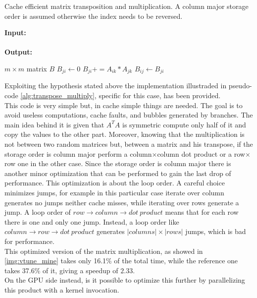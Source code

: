 \begin{algorithm}[h]
  \begin{flushleft}
    \caption{Cache efficient matrix transposition and multiplication. A column major storage order is assumed otherwise the index needs to be reversed.}
    \label{alg:transpose_multiply}
    \textbf{Input:} \\
    \hspace*{\algorithmicindent} \\
    \textbf{Output:} \\
    \hspace*{\algorithmicindent} 
  \end{flushleft}
  \begin{algorithmic}[1]
    \State $m \times m$ matrix $B$
         
        \State $B_{ji} \gets 0$
        \State $B_{ji}+=A_{ik}*A_{jk}$
        \EndFor
        \State $B_{ij} \gets B_{ji}$ 
        \EndFor
        \EndFor
        \EndFunction
      \end{algorithmic}
    \end{algorithm}
Exploiting the hypothesis stated above the implementation illustraded in pseudo-code \ref{alg:transpose_multiply}, specific for this case, has been provided.\\
This code is very simple but, in cache simple things are needed. The goal is to avoid useless computations, cache faults, and bubbles generated by branches. The main idea behind it is given that $A^TA$ is symmetric compute only half of it and copy the values to the other part. Moreover, knowing that the multiplication is not between two random matrices but, between a matrix and his transpose, if the storage order is column major perform a column$\times$column dot product or a row$\times$row one in the other case. Since the storage order is column major there is another minor optimization that can be performed to gain the last drop of performance. This optimization is about the loop order. A careful choice minimizes jumps, for example in this particular case iterate over column generates no jumps neither cache misses, while iterating over rows generate a jump. A loop order of $row \rightarrow column \rightarrow dot\ product$ means that for each row there is one and only one jump. Instead, a loop order like $column \rightarrow row \rightarrow dot\ product$ generates $|columns| \times |rows|$ jumps, which is bad for performance. \\
This optimized version of the matrix multiplication, as showed in \ref{img:vtune_mine} takes only 16.1\% of the total time, while the reference one takes 37.6\% of it, giving a speedup of $2.33$.\\
On the GPU side instead, is it possible to optimize this further by parallelizing this product with a kernel invocation. \\
